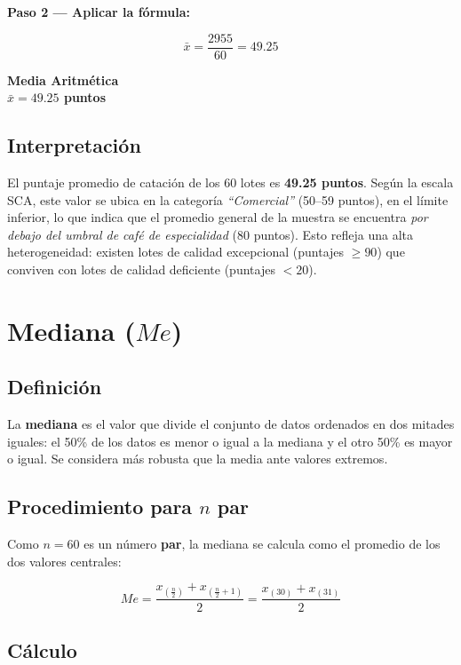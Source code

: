 \documentclass[12pt,a4paper]{article}
\newcommand{\cajaresultado}[2]{%
  \begin{center}
    \colorbox{cremoso}{%
      \parbox{0.85\textwidth}{%
        \vspace{4pt}
        \centering
        \textbf{\textcolor{cafeoscuro}{#1}} \\[4pt]
        \Large\textcolor{cafemedio}{\textbf{#2}}
        \vspace{4pt}
      }
    }
  \end{center}
}
\begin{document}
\textbf{Paso 2 — Aplicar la fórmula:}

\begin{equation}
  \bar{x} = \frac{2955}{60} = 49.25
\end{equation}

\cajaresultado{Media Aritmética}{\(\bar{x} = 49.25\) puntos}

\subsection{Interpretación}

El puntaje promedio de catación de los 60 lotes es \textbf{49.25 puntos}. Según la escala SCA, este valor se ubica en la categoría \textit{``Comercial''} (50--59 puntos), en el límite inferior, lo que indica que el promedio general de la muestra se encuentra \textit{por debajo del umbral de café de especialidad} (80 puntos). Esto refleja una alta heterogeneidad: existen lotes de calidad excepcional (puntajes $\geq 90$) que conviven con lotes de calidad deficiente (puntajes $< 20$).

\section{Mediana (\(Me\))}

\subsection{Definición}

La \textbf{mediana} es el valor que divide el conjunto de datos ordenados en dos mitades iguales: el 50\% de los datos es menor o igual a la mediana y el otro 50\% es mayor o igual. Se considera más robusta que la media ante valores extremos.

\subsection{Procedimiento para $n$ par}

Como $n = 60$ es un número \textbf{par}, la mediana se calcula como el promedio de los dos valores centrales:

\begin{equation}
  Me = \frac{x_{\left(\frac{n}{2}\right)} + x_{\left(\frac{n}{2}+1\right)}}{2} = \frac{x_{(30)} + x_{(31)}}{2}
\end{equation}

\subsection{Cálculo}
\end{document}
